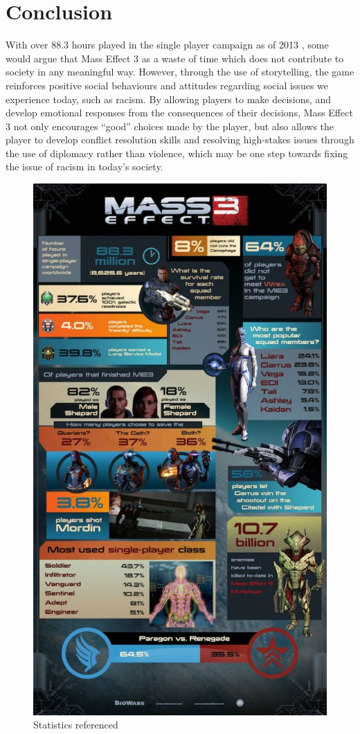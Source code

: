 \documentclass[journal]{IEEEtran}
\begin{document}

\section{Conclusion}
With over 88.3 hours played in the single player campaign as of 2013 \cite{ea},
some would argue that Mass Effect 3 as a waste of time which
does not contribute to society in any meaningful way. However,
through the use of storytelling, the game reinforces positive social behaviours
and attitudes regarding social issues we experience today, such as racism.
By allowing players to make decisions, and develop emotional responses from the
consequences of their decisions,  Mass Effect 3 not only encourages ``good'' choices made by the player, but also allows the player to develop conflict resolution skills and resolving high-stakes issues through the use of diplomacy rather than violence, which may be one step towards fixing the issue of racism
in today's society.
\nocite{*}



\begin{figure}[]
 \includegraphics[width=.45\textwidth]{stat.jpg}
 \caption{Statistics referenced \cite{ea}}
\end{figure}
\end{document}
